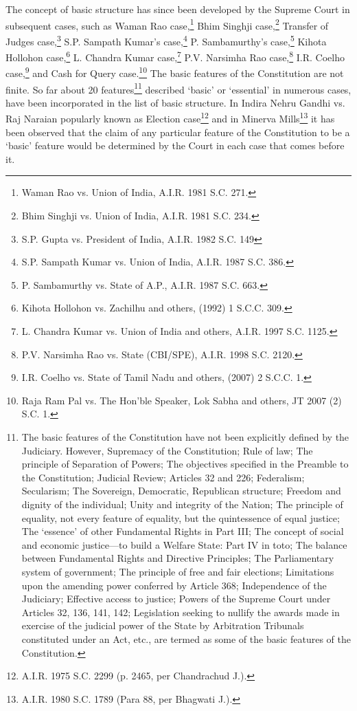 \begin{multicols}{2}
\noi
The concept of basic structure has since been developed by the Supreme Court in subsequent
cases, such as Waman Rao case,\footnote{Waman Rao vs. Union of India, A.I.R. 1981 S.C. 271.} Bhim Singhji case,\footnote{Bhim Singhji vs. Union of India, A.I.R. 1981 S.C. 234.} Transfer of Judges case,\footnote{S.P. Gupta vs. President of India, A.I.R. 1982 S.C. 149} S.P. Sampath Kumar’s case,\footnote{S.P. Sampath Kumar vs. Union of India, A.I.R. 1987 S.C. 386.} P. Sambamurthy’s case,\footnote{P. Sambamurthy vs. State of A.P., A.I.R. 1987 S.C. 663.} Kihota Hollohon case,\footnote{Kihota Hollohon vs. Zachilhu and others, (1992) 1 S.C.C. 309.} L. Chandra Kumar case,\footnote{L. Chandra Kumar vs. Union of India and others, A.I.R. 1997 S.C. 1125.} P.V. Narsimha Rao case,\footnote{P.V. Narsimha Rao vs. State (CBI/SPE), A.I.R. 1998 S.C. 2120.} I.R. Coelho case,\footnote{I.R. Coelho vs. State of Tamil Nadu and others, (2007) 2 S.C.C. 1.} and Cash for Query case.\footnote{Raja Ram Pal vs. The Hon’ble Speaker, Lok Sabha and others, JT 2007 (2) S.C. 1.} The basic features of the Constitution are not finite. So far about 20 features\footnote{The basic features of the Constitution have not been explicitly defined by the Judiciary. However, Supremacy
of the Constitution; Rule of law; The principle of Separation of Powers; The objectives specified in the Preamble
to the Constitution; Judicial Review; Articles 32 and 226; Federalism; Secularism; The Sovereign, Democratic,
Republican structure; Freedom and dignity of the individual; Unity and integrity of the Nation; The principle of
equality, not every feature of equality, but the quintessence of equal justice; The ‘essence’ of other Fundamental
Rights in Part III; The concept of social and economic justice—to build a Welfare State: Part IV in toto; The
balance between Fundamental Rights and Directive Principles; The Parliamentary system of government; The
principle of free and fair elections; Limitations upon the amending power conferred by Article 368; Independence
of the Judiciary; Effective access to justice; Powers of the Supreme Court under Articles 32, 136, 141, 142;
Legislation seeking to nullify the awards made in exercise of the judicial power of the State by Arbitration
Tribunals constituted under an Act, etc., are termed as some of the basic features of the Constitution.} described ‘basic’ or ‘essential’ in numerous cases, have been incorporated in the list of basic structure. In Indira Nehru Gandhi vs. Raj Naraian popularly known as Election case\footnote{A.I.R. 1975 S.C. 2299 (p. 2465, per Chandrachud J.).} and in Minerva Mills\footnote{A.I.R. 1980 S.C. 1789 (Para 88, per Bhagwati J.).} it
has been observed that the claim of any particular feature of the Constitution to be a ‘basic’
feature would be determined by the Court in each case that comes before it.


\end{multicols}
